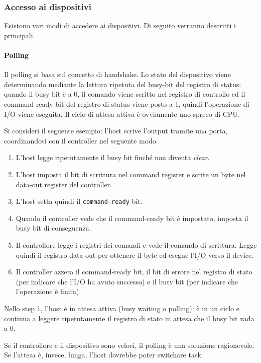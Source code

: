 \documentclass[a4paper]{article}
\begin{document}
\subsubsection{Accesso ai dispositivi}
Esistono vari modi di accedere ai dispositivi. Di seguito verranno descritti i principali.

\paragraph{Polling}
Il polling si basa sul concetto di handshake. Lo stato del dispositivo viene determinando mediante la lettura ripetuta del busy-bit del registro di status: quando il busy bit è a 0, il comando viene scritto nel registro di controllo ed il command ready bit del registro di status viene posto a 1, quindi l'operazione di I/O viene eseguita. Il ciclo di attesa attiva è ovviamente uno spreco di CPU.

Si consideri il seguente esempio: l'host scrive l'output tramite una porta, coordinandosi con il controller nel seguente modo.
\begin{enumerate}
    \item L'host legge ripetutamente il busy bit finché non diventa \textit{clear}.
    \item L'host imposta il bit di scrittura nel command register e scrite un byte nel data-out register del controller.
    \item L'host setta quindi il \texttt{command-ready} bit.
    \item Quando il controller vede che il command-ready bit è impostato, imposta il busy bit di conseguenza.
    \item Il controllore legge i registri dei comandi e vede il comando di scrittura. Legge quindi il registro data-out per ottenere il byte ed esegue l'I/O verso il device.
    \item Il controller azzera il command-ready bit, il bit di errore nel registro di stato (per indicare che l'I/O ha avuto successo) e il busy bit (per indicare che l'operazione è finita).
\end{enumerate}

Nello step 1, l'host è in attesa attiva (busy waiting o polling): è in un ciclo e continua a leggere ripetutamente il registro di stato in attesa che il busy bit vada a 0.

Se il controllore e il dispositivo sono veloci, il polling è una soluzione ragionevole. Se l'attesa è, invece, lunga, l'host dovrebbe poter switchare task.
\end{document}
